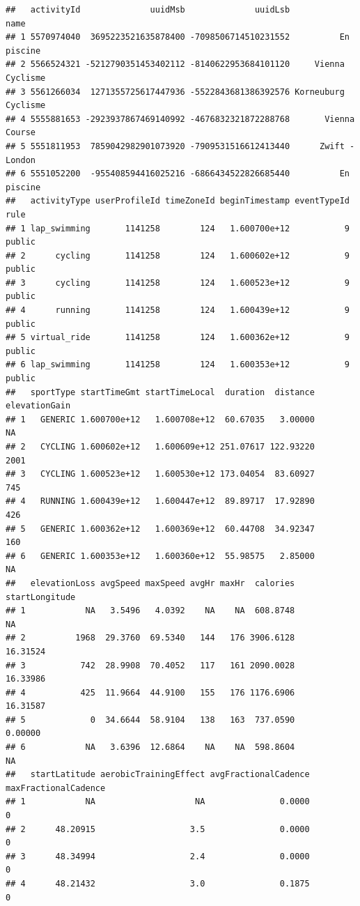 \documentclass[
]{book}
\begin{document}
\begin{verbatim}
##   activityId              uuidMsb              uuidLsb                name
## 1 5570974040  3695223521635878400 -7098506714510231552          En piscine
## 2 5566524321 -5212790351453402112 -8140622953684101120     Vienna Cyclisme
## 3 5561266034  1271355725617447936 -5522843681386392576 Korneuburg Cyclisme
## 4 5555881653 -2923937867469140992 -4676832321872288768       Vienna Course
## 5 5551811953  7859042982901073920 -7909531516612413440      Zwift - London
## 6 5551052200  -955408594416025216 -6866434522826685440          En piscine
##   activityType userProfileId timeZoneId beginTimestamp eventTypeId   rule
## 1 lap_swimming       1141258        124   1.600700e+12           9 public
## 2      cycling       1141258        124   1.600602e+12           9 public
## 3      cycling       1141258        124   1.600523e+12           9 public
## 4      running       1141258        124   1.600439e+12           9 public
## 5 virtual_ride       1141258        124   1.600362e+12           9 public
## 6 lap_swimming       1141258        124   1.600353e+12           9 public
##   sportType startTimeGmt startTimeLocal  duration  distance elevationGain
## 1   GENERIC 1.600700e+12   1.600708e+12  60.67035   3.00000            NA
## 2   CYCLING 1.600602e+12   1.600609e+12 251.07617 122.93220          2001
## 3   CYCLING 1.600523e+12   1.600530e+12 173.04054  83.60927           745
## 4   RUNNING 1.600439e+12   1.600447e+12  89.89717  17.92890           426
## 5   GENERIC 1.600362e+12   1.600369e+12  60.44708  34.92347           160
## 6   GENERIC 1.600353e+12   1.600360e+12  55.98575   2.85000            NA
##   elevationLoss avgSpeed maxSpeed avgHr maxHr  calories startLongitude
## 1            NA   3.5496   4.0392    NA    NA  608.8748             NA
## 2          1968  29.3760  69.5340   144   176 3906.6128       16.31524
## 3           742  28.9908  70.4052   117   161 2090.0028       16.33986
## 4           425  11.9664  44.9100   155   176 1176.6906       16.31587
## 5             0  34.6644  58.9104   138   163  737.0590        0.00000
## 6            NA   3.6396  12.6864    NA    NA  598.8604             NA
##   startLatitude aerobicTrainingEffect avgFractionalCadence maxFractionalCadence
## 1            NA                    NA               0.0000                    0
## 2      48.20915                   3.5               0.0000                    0
## 3      48.34994                   2.4               0.0000                    0
## 4      48.21432                   3.0               0.1875                    0

\end{verbatim}
\end{document}
